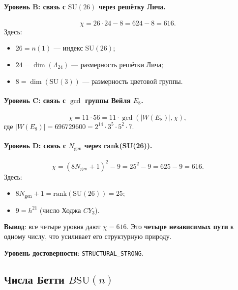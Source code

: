 \documentclass[11pt,a4paper]{article}
\newcommand{\SU}{\ensuremath{\mathrm{SU}}}
\newcommand{\CY}{\ensuremath{CY_3}}
\newcommand{\Ngen}{\ensuremath{N_{\text{gen}}}}
\newcommand{\BSU}{\ensuremath{B\mathrm{SU}}}
\theoremstyle{definition}
\begin{document}
\paragraph{Уровень B: связь с \texorpdfstring{$\SU(26)$}{(26)} через решётку Лича.}
\begin{equation}
    \chi = 26 \cdot 24 - 8 = 624 - 8 = 616.
\end{equation}
Здесь:
\begin{itemize}
    \item $26 = n(1)$ --- индекс $\SU(26)$;
    \item $24 = \dim(\Lambda_{24})$ --- размерность решётки Лича;
    \item $8 = \dim(\SU(3))$ --- размерность цветовой группы.
\end{itemize}

\paragraph{Уровень C: связь с \texorpdfstring{$\gcd$}{} группы Вейля \texorpdfstring{$E_8$}{E_8}.}
\begin{equation}
    \chi = 11 \cdot 56 = 11 \cdot \gcd(|W(E_8)|, \chi),
\end{equation}
где $|W(E_8)| = 696729600 = 2^{14} \cdot 3^5 \cdot 5^2 \cdot 7$.

\paragraph{Уровень D: связь с $N_{\text{gen}}$ через rank(SU(26)).}
\begin{equation}
    \chi = (8 \Ngen + 1)^2 - 9 = 25^2 - 9 = 625 - 9 = 616.
\end{equation}
Здесь:
\begin{itemize}
    \item $8 \Ngen + 1 = \text{rank}(\SU(26)) = 25$;
    \item $9 = h^{21}$ (число Ходжа $\CY$).
\end{itemize}

\medskip\noindent
\textbf{Вывод}: все четыре уровня дают $\chi = 616$. Это
\textbf{четыре независимых пути} к одному числу, что усиливает
его структурную природу.

\medskip\noindent
\textbf{Уровень достоверности}: \texttt{STRUCTURAL\_STRONG}.

\subsection{Числа Бетти \texorpdfstring{$\BSU(n)$}{B SU(n)}}
\label{subsec:betti}
\end{document}
